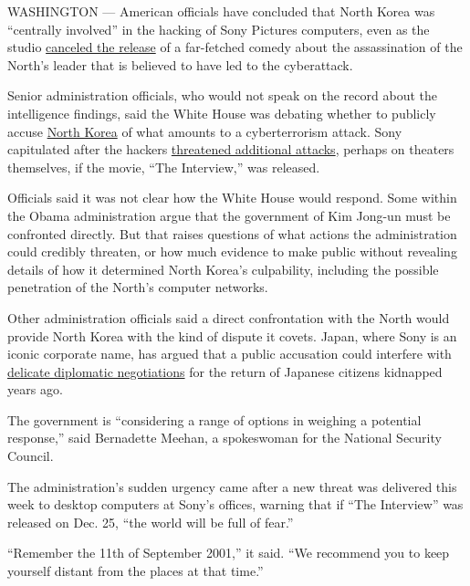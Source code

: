 WASHINGTON --- American officials have concluded that North Korea was
``centrally involved'' in the hacking of Sony Pictures computers, even
as the studio
\href{http://www.nytimes.com/2014/12/18/business/sony-the-interview-threats.html?_r=0}{canceled
the release} of a far-fetched comedy about the assassination of the
North's leader that is believed to have led to the cyberattack.

Senior administration officials, who would not speak on the record about
the intelligence findings, said the White House was debating whether to
publicly accuse
\href{http://topics.nytimes.com/top/news/international/countriesandterritories/northkorea/index.html?inline=nyt-geo}{North
Korea} of what amounts to a cyberterrorism attack. Sony capitulated
after the hackers
\href{http://www.nytimes.com/2014/12/17/business/media/sony-weighs-terrorism-threat-against-opening-of-the-interview.html}{threatened
additional attacks}, perhaps on theaters themselves, if the movie, ``The
Interview,'' was released.

Officials said it was not clear how the White House would respond. Some
within the Obama administration argue that the government of Kim Jong-un
must be confronted directly. But that raises questions of what actions
the administration could credibly threaten, or how much evidence to make
public without revealing details of how it determined North Korea's
culpability, including the possible penetration of the North's computer
networks.

Other administration officials said a direct confrontation with the
North would provide North Korea with the kind of dispute it covets.
Japan, where Sony is an iconic corporate name, has argued that a public
accusation could interfere with
\href{http://www.nytimes.com/2014/05/30/world/asia/north-korea-agrees-to-investigate-fate-of-japanese-abducted-decades-ago.html?module=Search\&mabReward=relbias\%3As\%2C\%7B\%221\%22\%3A\%22RI\%3A8\%22\%7D}{delicate
diplomatic negotiations} for the return of Japanese citizens kidnapped
years ago.

The government is ``considering a range of options in weighing a
potential response,'' said Bernadette Meehan, a spokeswoman for the
National Security Council.

The administration's sudden urgency came after a new threat was
delivered this week to desktop computers at Sony's offices, warning that
if ``The Interview'' was released on Dec. 25, ``the world will be full
of fear.''

``Remember the 11th of September 2001,'' it said. ``We recommend you to
keep yourself distant from the places at that time.''

